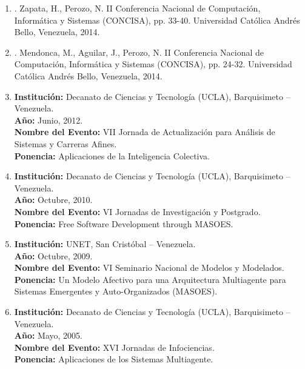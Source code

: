 \begin{enumerate}
\item {}. Zapata, H.,
Perozo, N. II Conferencia Nacional de Computación, Informática y Sistemas (CONCISA), pp. 33-40. Universidad Católica Andrés Bello, Venezuela, 2014.

\item {}. Mendonca, M.,
Aguilar, J., Perozo, N. II Conferencia Nacional de Computación, Informática y Sistemas (CONCISA), pp. 24-32. Universidad Católica Andrés Bello, Venezuela, 2014.

\item \textbf{Institución:} Decanato de Ciencias y Tecnología (UCLA), Barquisimeto – Venezuela.\\
\textbf{Año:} Junio, 2012.\\
\textbf{Nombre del Evento:} VII Jornada de Actualización para Análisis de Sistemas y Carreras Afines.\\
\textbf{Ponencia:} Aplicaciones de la Inteligencia Colectiva.

\item \textbf{Institución:} Decanato de Ciencias y Tecnología (UCLA), Barquisimeto – Venezuela.\\
\textbf{Año:} Octubre, 2010.\\
\textbf{Nombre del Evento:} VI Jornadas de Investigación y Postgrado.\\
\textbf{Ponencia:} Free Software Development through MASOES.

\item \textbf{Institución:} UNET, San Cristóbal – Venezuela.\\
\textbf{Año:} Octubre, 2009.\\
\textbf{Nombre del Evento:} VI Seminario Nacional de Modelos y Modelados.\\
\textbf{Ponencia:} Un Modelo Afectivo para una Arquitectura Multiagente para
Sistemas Emergentes y Auto-Organizados (MASOES).

\item \textbf{Institución:} Decanato de Ciencias y Tecnología (UCLA), Barquisimeto – Venezuela.\\
\textbf{Año:} Mayo, 2005.\\
\textbf{Nombre del Evento:} XVI Jornadas de Infociencias.\\
\textbf{Ponencia:} Aplicaciones de los Sistemas Multiagente.


\end{enumerate}
